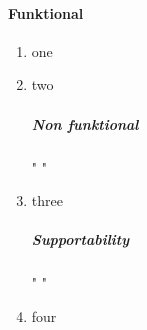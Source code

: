 \documentclass[class=article, crop=false]{standalone}
\begin{document}
    \paragraph{Funktional}
    \begin{enumerate}[label=\textbf{K\arabic*}]

        \item one
        \item two

        \setlength{\parindent}{-2.3em}
        \subparagraph{Non funktional}" "
        \item three

        \setlength{\parindent}{-1em}
        \subparagraph{Supportability}" "
        \item four

    \end{enumerate}
\end{document}
